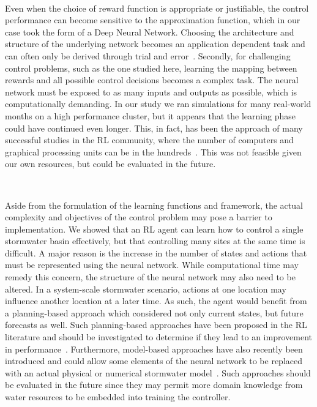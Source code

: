 \

Even when the choice of reward function is appropriate or justifiable, the control performance can become sensitive to the approximation function, which in our case took the form of a Deep Neural Network.
Choosing the architecture and structure of the underlying network becomes an application dependent task and can often only be derived through trial and error~\cite{Sutton98, henderson2017Deep}.
Secondly, for challenging control problems, such as the one studied here, learning the mapping between rewards and all possible control decisions becomes a complex task.
The neural network must be exposed to as many inputs and outputs as possible, which is computationally demanding.
In our study we ran simulations for many real-world months on a high performance cluster, but it appears that the learning phase could have continued even longer.
This, in fact, has been the approach of many successful studies in the RL community, where the number of computers and graphical processing units can be in the hundreds~\cite{espeholt2018impala, OpenAI_dota}.
This was not feasible given our own resources, but could be evaluated in the future.

\

Aside from the formulation of the learning functions and framework, the actual complexity and objectives of the control problem may pose a barrier to implementation.
We showed that an RL agent can learn how to control a single stormwater basin effectively, but that controlling many sites at the same time is difficult.
A major reason is the increase in the number of states and actions that must be represented using the neural network.
While computational time may remedy this concern, the structure of the neural network may also need to be altered.
In a system-scale stormwater scenario, actions at one location may influence another location at a later time.
As such, the agent would benefit from a planning-based approach which considered not only current states, but future forecasts as well.
Such planning-based approaches have been proposed in the RL literature and should be investigated to determine if they lead to an improvement in performance~\cite{clavera2018model,depeweg2016learning}.
Furthermore, model-based approaches have also recently been introduced and could allow some elements of the neural network to be replaced with an actual physical or numerical stormwater model~\cite{gu2016continuous}.
Such approaches should be evaluated in the future since they may permit more domain knowledge from water resources to be embedded into training the controller.

